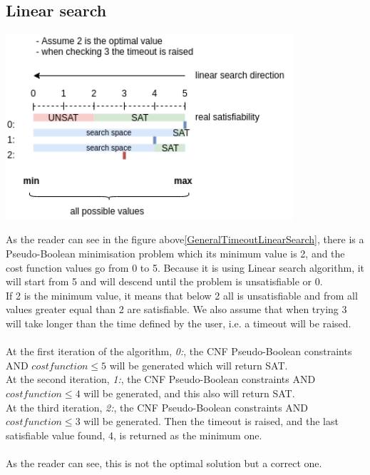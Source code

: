 \subsection{Linear search}
\begin{center}
	\includegraphics[width=0.8\textwidth]{Figures/GeneralTimeoutLinearSearch.png}
	\label{GeneralTimeoutLinearSearch}
\end{center}
As the reader can see in the figure above\ref{GeneralTimeoutLinearSearch}, there is a Pseudo-Boolean minimisation problem which its minimum value is 2, and the cost function values go from 0 to 5. Because it is using Linear search algorithm, it will start from 5 and will descend until the problem is unsatisfiable or 0. \\
If 2 is the minimum value, it means that below 2 all is unsatisfiable and from all values greater equal than 2 are satisfiable.  We also assume that when trying 3 will take longer than the time defined by the user, i.e. a timeout will be raised.\\\\
At the first iteration of the algorithm, \emph{0:}, the CNF Pseudo-Boolean constraints AND $cost function \leq 5$ will be generated which will return SAT.\\
At the second iteration, \emph{1:}, the CNF Pseudo-Boolean constraints AND $cost function \leq 4$ will be generated, and this also will return SAT.\\
At the third iteration, \emph{2:}, the CNF Pseudo-Boolean constraints AND $cost function \leq 3$ will be generated. Then the timeout is raised, and the last satisfiable value found, 4, is returned as the minimum one.\\\\
As the reader can see, this is not the optimal solution but a correct one. 

